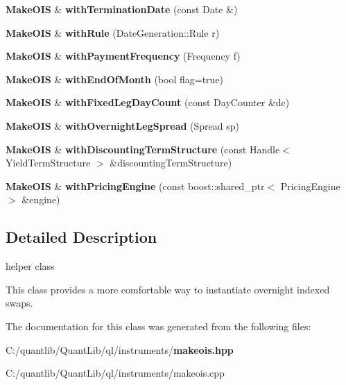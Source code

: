 \begin{DoxyCompactItemize}
\item 
{\bf Make\+O\+IS} \& {\bfseries with\+Termination\+Date} (const Date \&)\label{class_quant_lib_1_1_make_o_i_s_a5ce30792175e1e446cd6629600e09174}

\item 
{\bf Make\+O\+IS} \& {\bfseries with\+Rule} (Date\+Generation\+::\+Rule r)\label{class_quant_lib_1_1_make_o_i_s_a64cddf30e5c2d496f88a03b3b4a474fa}

\item 
{\bf Make\+O\+IS} \& {\bfseries with\+Payment\+Frequency} (Frequency f)\label{class_quant_lib_1_1_make_o_i_s_a92c93fd5478824d422b53dc956623738}

\item 
{\bf Make\+O\+IS} \& {\bfseries with\+End\+Of\+Month} (bool flag=true)\label{class_quant_lib_1_1_make_o_i_s_a245c14dbfe76ebbe91dedbfcf2d1c1d0}

\item 
{\bf Make\+O\+IS} \& {\bfseries with\+Fixed\+Leg\+Day\+Count} (const Day\+Counter \&dc)\label{class_quant_lib_1_1_make_o_i_s_adb2e6118c17b2756c41220262dd1f4d6}

\item 
{\bf Make\+O\+IS} \& {\bfseries with\+Overnight\+Leg\+Spread} (Spread sp)\label{class_quant_lib_1_1_make_o_i_s_abd6df2a0cb822a139296f15151741fed}

\item 
{\bf Make\+O\+IS} \& {\bfseries with\+Discounting\+Term\+Structure} (const Handle$<$ Yield\+Term\+Structure $>$ \&discounting\+Term\+Structure)\label{class_quant_lib_1_1_make_o_i_s_a9f9a8721f2f66003fc112746883e1a0a}

\item 
{\bf Make\+O\+IS} \& {\bfseries with\+Pricing\+Engine} (const boost\+::shared\+\_\+ptr$<$ Pricing\+Engine $>$ \&engine)\label{class_quant_lib_1_1_make_o_i_s_ace837ce8d58d952c27b2ba0c0e8e3ace}

\end{DoxyCompactItemize}


\subsection{Detailed Description}
helper class 

This class provides a more comfortable way to instantiate overnight indexed swaps. 

The documentation for this class was generated from the following files\+:\begin{DoxyCompactItemize}
\item 
C\+:/quantlib/\+Quant\+Lib/ql/instruments/{\bf makeois.\+hpp}\item 
C\+:/quantlib/\+Quant\+Lib/ql/instruments/makeois.\+cpp\end{DoxyCompactItemize}
